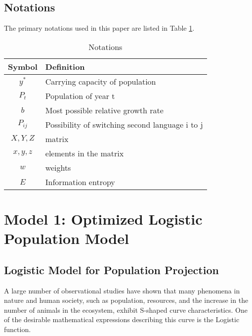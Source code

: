 \documentclass[12pt]{article}  %
\begin{document}
\subsection{Notations}
The primary notations used in this paper are listed in Table \ref{tb:notation}.
\begin{table}[!htbp]
	\begin{center}
		\caption{Notations}
		\begin{tabular}{cl}
			\toprule
			\multicolumn{1}{m{3cm}}{\centering Symbol}
			&\multicolumn{1}{m{8cm}}{\centering Definition}\\
			\midrule
			${y^*}$&Carrying capacity of population\\
			${P_{t}}$&Population of year t\\
			$b$ &Most possible relative growth rate\\
			${P_{ij}}$&Possibility of switching second language i to j\\
			$X,Y,Z$&matrix\\
			$x,y,z$&elements in the matrix\\
			$w$ &weights\\
			$E$ &Information entropy\\
			\bottomrule
		\end{tabular}\label{tb:notation}
	\end{center}
\end{table}

\section{Model 1: Optimized Logistic Population Model}
\subsection{Logistic Model for Population Projection}

A large number of observational studies have shown that many phenomena in nature and human society, such as population, resources, and the increase in the number of animals in the ecosystem, exhibit S-shaped curve characteristics. One of the desirable mathematical expressions describing this curve is the Logistic function.
\end{document}
